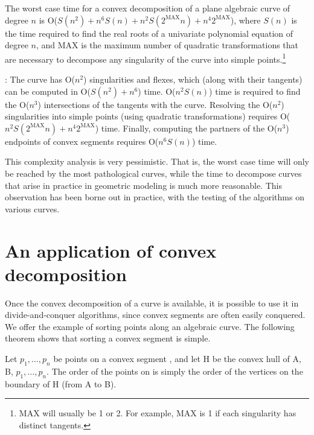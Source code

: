 \begin{theorem}
The worst case time for a convex decomposition of a plane algebraic
curve of degree $n$ is 
O($S(n^{2}) + n^{6}S(n) + n^{2}S(2^{\mbox{MAX}}n) + n^{4}2^{\mbox{MAX}}$),
where $S(n)$ is the time required to find the real roots of a univariate
polynomial equation of degree $n$, and MAX is the maximum number
of quadratic transformations that are necessary to decompose any
singularity of the curve into simple points.\footnote{MAX will usually
be 1 or 2.  For example, MAX is 1 if each singularity has distinct
tangents.}
\end{theorem}
:
The curve has O($n^{2}$) singularities and flexes, which 
(along with their tangents) can be computed in O($S(n^{2}) + n^{6}$) time.
O($n^{2}S(n)$) time is required to find the O($n^3$) intersections of the
tangents with the curve.
Resolving the O($n^{2}$) singularities into simple points (using quadratic 
transformations) requires O($n^{2} S(2^{\mbox{MAX}}n) + n^{4}2^{\mbox{MAX}}$)
time.
Finally, computing the partners of the O($n^{3}$) endpoints of convex segments
requires O($n^{6}S(n)$) time.
\QED

This complexity analysis is very pessimistic.
That is, the worst case time will only be reached by the most
pathological curves, while the time to decompose 
curves that arise in practice in geometric modeling
is much more reasonable.
This observation has been borne out in practice, with the testing of 
the algorithms on various curves.

\section{An application of convex decomposition}
Once the convex decomposition of a curve is available, it is possible
to use it in divide-and-conquer algorithms, since convex segments are
often easily conquered.
We offer the example of sorting points along an algebraic curve.
The following theorem shows that sorting a convex segment is simple.

\begin{theorem}
\label{thm-sort}
Let $p_{1},\ldots,p_{n}$ be points on a convex segment , 
and let H be the convex hull of A, B, $p_{1},\ldots,p_{n}$.
The order of the points on  is simply 
the order of the vertices on the boundary of H (from A to B).
\end{theorem}

